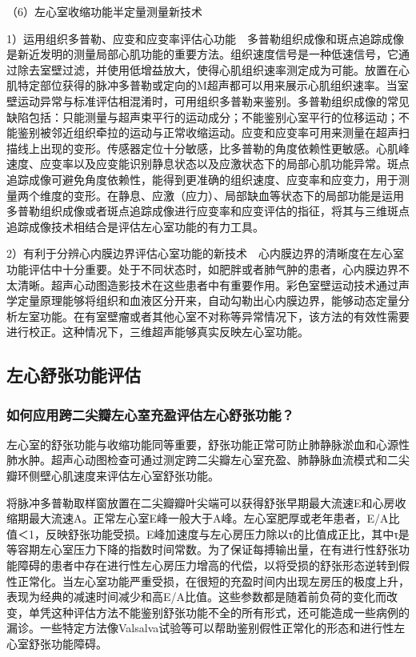 （6）左心室收缩功能半定量测量新技术

1）运用组织多普勒、应变和应变率评估心功能　多普勒组织成像和斑点追踪成像是新近发明的测量局部心肌功能的重要方法。组织速度信号是一种低速信号，它通过除去室壁过滤，并使用低增益放大，使得心肌组织速率测定成为可能。放置在心肌特定部位获得的脉冲多普勒或定向的M超声都可以用来展示心肌组织速率。当室壁运动异常与标准评估相混淆时，可用组织多普勒来鉴别。多普勒组织成像的常见缺陷包括：只能测量与超声束平行的运动成分；不能鉴别心室平行的位移运动；不能鉴别被邻近组织牵拉的运动与正常收缩运动。应变和应变率可用来测量在超声扫描线上出现的变形。传感器定位十分敏感，比多普勒的角度依赖性更敏感。心肌峰速度、应变率以及应变能识别静息状态以及应激状态下的局部心肌功能异常。斑点追踪成像可避免角度依赖性，能得到更准确的组织速度、应变率和应变力，用于测量两个维度的变形。在静息、应激（应力）、局部缺血等状态下的局部功能是运用多普勒组织成像或者斑点追踪成像进行应变率和应变评估的指征，将其与三维斑点追踪成像技术相结合是评估左心室功能的有力工具。

2）有利于分辨心内膜边界评估心室功能的新技术　心内膜边界的清晰度在左心室功能评估中十分重要。处于不同状态时，如肥胖或者肺气肿的患者，心内膜边界不太清晰。超声心动图造影技术在这些患者中有重要作用。彩色室壁运动技术通过声学定量原理能够将组织和血液区分开来，自动勾勒出心内膜边界，能够动态定量分析左室功能。在有室壁瘤或者其他心室不对称等异常情况下，该方法的有效性需要进行校正。这种情况下，三维超声能够真实反映左心室功能。

\subsection{左心舒张功能评估}

\subsubsection{如何应用跨二尖瓣左心室充盈评估左心舒张功能？}

左心室的舒张功能与收缩功能同等重要，舒张功能正常可防止肺静脉淤血和心源性肺水肿。超声心动图检查可通过测定跨二尖瓣左心室充盈、肺静脉血流模式和二尖瓣环侧壁心肌速度来评估左心室舒张功能。

将脉冲多普勒取样窗放置在二尖瓣瓣叶尖端可以获得舒张早期最大流速E和心房收缩期最大流速A。正常左心室E峰一般大于A峰。左心室肥厚或老年患者，E/A比值＜1，反映舒张功能受损。E峰加速度与左心房压力除以τ的比值成正比，其中τ是等容期左心室压力下降的指数时间常数。为了保证每搏输出量，在有进行性舒张功能障碍的患者中存在进行性左心房压力增高的代偿，以将受损的舒张形态逆转到假性正常化。当左心室功能严重受损，在很短的充盈时间内出现左房压的极度上升，表现为经典的减速时间减少和高E/A比值。这些参数都是随着前负荷的变化而改变，单凭这种评估方法不能鉴别舒张功能不全的所有形式，还可能造成一些病例的漏诊。一些特定方法像Valsalva试验等可以帮助鉴别假性正常化的形态和进行性左心室舒张功能障碍。

